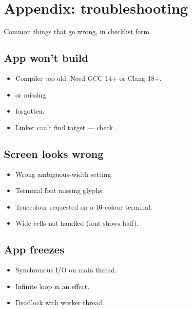 \chapter{Appendix: troubleshooting}
\label{ch:troubleshoot}

\begin{aside}
Common things that go wrong, in checklist form.
\end{aside}

\section{App won't build}

\begin{itemize}[leftmargin=*]
  \item Compiler too old. Need GCC 14+ or Clang 18+.
  \item {} or  missing.
  \item {} forgotten.
  \item Linker can't find  target ---
    check .
\end{itemize}

\section{Screen looks wrong}

\begin{itemize}[leftmargin=*]
  \item Wrong ambiguous-width setting.
  \item Terminal font missing glyphs.
  \item Truecolour requested on a 16-colour terminal.
  \item Wide cells not handled (font shows half).
\end{itemize}

\section{App freezes}

\begin{itemize}[leftmargin=*]
  \item Synchronous I/O on main thread.
  \item Infinite loop in an effect.
  \item Deadlock with worker thread.
\end{itemize}

